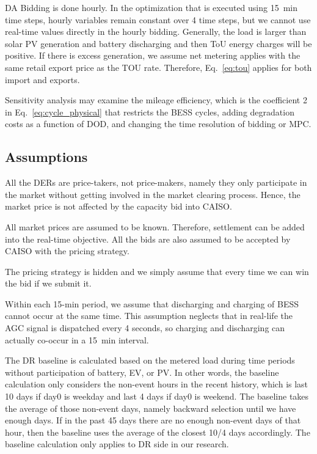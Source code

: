 \documentclass[conference]{IEEEtran}
\begin{document}
DA Bidding is done hourly. In the optimization that is executed using 15~min time steps, hourly variables remain constant over 4 time steps, but we cannot use real-time values directly in the hourly bidding. Generally, the load is larger than solar PV generation and battery discharging and then ToU energy charges will be positive. If there is excess generation, we assume net metering applies with the same retail export price as the TOU rate. Therefore, Eq.~\ref{eq:tou} applies for both import and exports.

Sensitivity analysis may examine the mileage efficiency, which is the coefficient 2 in Eq.~\ref{eq:cycle_physical} that restricts the BESS cycles, adding degradation costs as a function of DOD, and changing the time resolution of bidding or MPC.

\subsection{Assumptions}
All the DERs are price-takers, not price-makers, namely they only participate in the market without getting involved in the market clearing process. Hence, the market price is not affected by the capacity bid into CAISO.

All market prices are assumed to be known. Therefore, settlement can be added into the real-time objective. All the bids are also assumed to be accepted by CAISO with the pricing strategy.

The pricing strategy is hidden and we simply assume that every time we can win the bid if we submit it.

Within each 15-min period, we assume that discharging and charging of BESS cannot occur at the same time.  This assumption neglects that in real-life the AGC signal is dispatched every 4 seconds, so charging and discharging can actually co-occur in a 15~min interval.

The DR baseline is calculated based on the metered load during time periods without participation of battery, EV, or PV. In other words, the baseline calculation only considers the non-event hours in the recent history, which is last 10 days if day0 is weekday and last 4 days if day0 is weekend. The baseline takes the average of those non-event days, namely backward selection until we have enough days. If in the past 45 days there are no enough non-event days of that hour, then the baseline uses the average of the closest 10/4 days accordingly. The baseline calculation only applies to DR side in our research.
\end{document}
